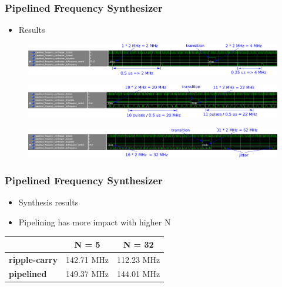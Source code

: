 \documentclass{beamer}
\begin{document}
\begin{frame}
\frametitle{Pipelined Frequency Synthesizer}

\begin{itemize}
    \item Results
\end{itemize}

\begin{figure}[!htb]
    \centering
    \includegraphics[width=\linewidth]{pipeline_2_4_MHz.PNG}
\end{figure}
\begin{figure}[!htb]
    \centering
    \includegraphics[width=\linewidth]{pipeline_20_22_MHz.PNG}
\end{figure}
\begin{figure}[!htb]
    \centering
    \includegraphics[width=\linewidth]{pipeline_32_62_MHz.PNG}
\end{figure}

\end{frame}

\begin{frame}
\frametitle{Pipelined Frequency Synthesizer}

\begin{itemize}
    \item Synthesis results
    \item Pipelining has more impact with higher N
\end{itemize}

\begin{table}[!htb]
    \centering
    \begin{tabular}[c]{ l | c | c }
        & \textbf{N = 5} & \textbf{N = 32} \\
        \hline
        \textbf{ripple-carry} & 142.71 MHz & 112.23 MHz \\
        \hline
        \textbf{pipelined} & 149.37 MHz & 144.01 MHz \\
    \end{tabular}
\end{table}

\end{frame}
\end{document}
